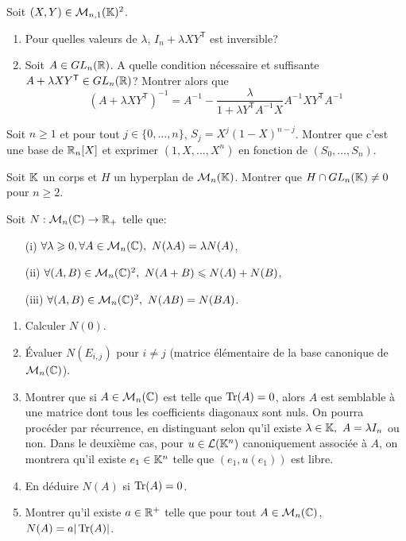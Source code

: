 \begin{exercise}
	Soit $(X,Y)\in\mathcal{M}_{n,1}(\mathbb{K})^{2}$.
	\begin{enumerate}
		\item
		Pour quelles valeurs de $\lambda$, $I_{n}+\lambda XY^\mathsf{T}$ est
		inversible?
		\item
		Soit $A\in GL_{n}(\mathbb{R})$. A quelle condition nécessaire et suffisante
		$A+\lambda XY^\mathsf{T}\in GL_{n}(\mathbb{R})$? Montrer alors que 
		$$(A+\lambda XY^\mathsf{T})^{-1}=A^{-1}-\frac{\lambda}{1+\lambda
		Y^{\mathsf{T}}A^{-1}X}A^{-1}XY^{\mathsf{T}}A^{-1}$$
	\end{enumerate}
\end{exercise}

\begin{exercise}
	Soit $n\geqslant1$ et pour tout $j\in\{0,\dots,n\}$, $S_{j}=X^{j}(1-X)^{n-j}$.
	Montrer que c'est une base de $\mathbb{R}_{n}[X]$ et exprimer $(1,X,\dots,X^{n})$ en
	fonction de $(S_{0},\dots,S_{n})$.
\end{exercise}

\begin{exercise}
	Soit $\mathbb{K}$ un corps et $H$ un hyperplan de $\mathcal{M}_{n}(\mathbb{K})$. Montrer que $H\cap
	GL_{n}(\mathbb{K})\neq 0$ pour $n\geqslant2$.
\end{exercise}

\begin{exercise}
	Soit $N:\mathcal{M}_{n}(\mathbb{C})\to\mathbb{R}_{+}$ telle que:
	\begin{enumerate}
		\item
		[(i)] $\forall \lambda\geqslant0,\forall A\in\mathcal{M}_{n}(\mathbb{C}),~N(\lambda
		A)=\lambda N(A)$,
		\item
		[(ii)] $\forall (A,B)\in\mathcal{M}_{n}(\mathbb{C})^{2},~N(A+B)\leqslant N(A)+N(B)$,
		\item
		[(iii)] $\forall (A,B)\in\mathcal{M}_{n}(\mathbb{C})^{2},~N(AB)=N(BA)$.
	\end{enumerate}
	\begin{enumerate}
		\item
		Calculer $N(0)$.
		\item
		Évaluer $N(E_{i,j})$ pour $i\neq j$ (matrice élémentaire de la base
		canonique de $\mathcal{M}_{n}(\mathbb{C})$).
		\item
		Montrer que si $A\in\mathcal{M}_{n}(\mathbb{C})$ est telle que $\operatorname{Tr}(A)=0$, alors $A$ est
		semblable à une matrice dont tous les coefficients diagonaux sont nuls. On
		pourra procéder par récurrence, en distinguant selon qu'il existe
		$\lambda\in\mathbb{K},~A=\lambda I_{n}$ ou non. Dans le deuxième cas, pour
		$u\in\mathcal{L}(\mathbb{K}^{n})$ canoniquement associée à $A$, on montrera qu'il existe
		$e_{1}\in\mathbb{K}^{n}$ telle que $(e_{1},u(e_{1}))$ est libre.
		\item
		En déduire $N(A)$ si $\operatorname{Tr}(A)=0$.
		\item
		Montrer qu'il existe $a\in\mathbb{R}^{+}$ telle que pour tout $A\in\mathcal{M}_{n}(\mathbb{C})$,
		$N(A)=a\vert\operatorname{Tr}(A)\vert$.
	\end{enumerate}
\end{exercise}

